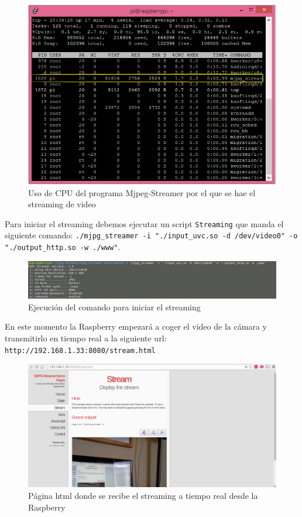 \documentclass[twoside, 12pt]{epstfg}
\begin{document}
\begin{figure}[h!]
	\centerline{
		\mbox{\includegraphics[width=.80\textwidth]{images/UsoCPUMjpeg.png}}
	}
	\caption{Uso de CPU del programa Mjpeg-Streamer por el que se hae el streaming de video}
\end{figure}


Para iniciar el streaming debemos ejecutar un script \texttt{Streaming} que manda el siguiente comando: \texttt{./mjpg\_streamer -i "./input\_uvc.so -d /dev/video0" -o "./output\_http.so -w ./www"}.



\begin{figure}[h!]
	\centerline{
		\mbox{\includegraphics[width=.80\textwidth]{images/Streamingcomando.png}}
	}
	\caption{Ejecución del comando para iniciar el streaming}
\end{figure}

En este momento la Raspberry empezará a coger el video de la cámara y transmitirlo en tiempo real a la siguiente url: \texttt{http://192.168.1.33:8080/stream.html}

\begin{figure}[h!]
	\centerline{
		\mbox{\includegraphics[width=.80\textwidth]{images/pagStream.png}}
	}
	\caption{Página html donde se recibe el streaming a tiempo real desde la Raspberry }
\end{figure}
\end{document}
